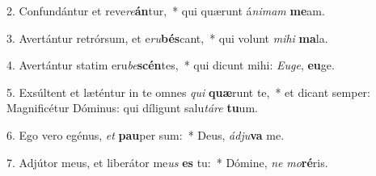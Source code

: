 2. Confundántur et reve\textit{re}\textbf{án}tur,~*  qui quærunt á\textit{ni}\textit{mam} \textbf{me}am.\

3. Avertántur retrórsum, et e\textit{ru}\textbf{bés}cant,~*  qui volunt \textit{mi}\textit{hi} \textbf{ma}la.\

4. Avertántur statim eru\textit{be}\textbf{scén}tes,~*  qui dicunt mihi: \textit{Eu}\textit{ge}, \textbf{eu}ge.\

5. Exsúltent et læténtur in te omnes \textit{qui} \textbf{quæ}runt te,~*  et dicant semper: Magnificétur Dóminus: qui díligunt salu\textit{tá}\textit{re} \textbf{tu}um.\

6. Ego vero egénus, \textit{et} \textbf{pau}per sum:~*  Deus, \textit{ád}\textit{ju}\textbf{va} me.\

7. Adjútor meus, et liberátor me\textit{us} \textbf{es} tu:~*  Dómine, \textit{ne} \textit{mo}\textbf{ré}ris.\

